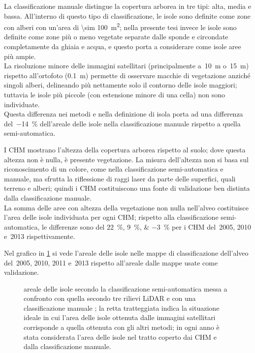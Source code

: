 \begin{aenumerate}
	\item La classificazione manuale  distingue la copertura arborea in tre tipi: alta, media e bassa.
	All'interno di questo tipo di classificazione, le isole sono definite come zone con alberi con un'area di \SI{\sim 100}{\m\tothe{2}}; nella presente tesi invece le isole sono definite come zone più o meno vegetate separate dalle sponde e circondate completamente da ghiaia e acqua, e questo porta a considerare come isole aree più ampie.
	\\
	La risoluzione minore delle immagini satellitari (principalmente a~\SI{10}{\m} o~\SI{15}{\m}) rispetto all'ortofoto (\SI{0.1}{\m}) permette di osservare macchie di vegetazione anziché singoli alberi, delineando più nettamente solo il contorno delle isole maggiori; tuttavia le isole più piccole (con estensione minore di una cella) non sono individuate.
	\\
	Questa differenza nei metodi e nella definizione di isola porta ad una differenza del~\SI{-14}{\percent} dell'areale delle isole nella classificazione manuale rispetto a quella semi-automatica.
	\item I CHM mostrano l'altezza della copertura arborea rispetto al suolo; dove questa altezza non è nulla, è presente vegetazione.
	La misura dell'altezza non si basa sul riconoscimento di un colore, come nella classificazione semi-automatica e manuale, ma sfrutta la riflessione di raggi laser da parte delle superfici, quali terreno e alberi; quindi i CHM costituiscono una fonte di validazione ben distinta dalla classificazione manuale.
	\\
	La somma delle aree con altezza della vegetazione non nulla nell'alveo costituisce l'area delle isole individuata per ogni CHM; rispetto alla classificazione semi-automatica, le differenze sono del \SIlist[list-separator = {, }, list-final-separator = { e }, retain-explicit-plus]{+22;+9;-3}{\percent} per i CHM del~2005, 2010 e~2013 rispettivamente.
\end{aenumerate}
%
Nel grafico in \cref{graph:validazione-class-is-fl} si vede l'areale delle isole nelle mappe di classificazione dell'alveo del~2005, 2010, 2011 e~2013 rispetto all'areale dalle mappe usate come validazione.
%
\begin{figure}
	\centering
	
	\caption[validazione della classificazione considerando le aree delle isole]{areale delle isole secondo la classificazione semi-automatica messa a confronto con quella secondo tre rilievi LiDAR e con una classificazione manuale ; la retta tratteggiata indica la situazione ideale in cui l'area delle isole ottenuta dalle immagini satellitari corrisponde a quella ottenuta con gli altri metodi; in ogni anno è stata considerata l'area delle isole nel tratto coperto dai CHM e dalla classificazione manuale.}
	\label{graph:validazione-class-is-fl}
\end{figure}

